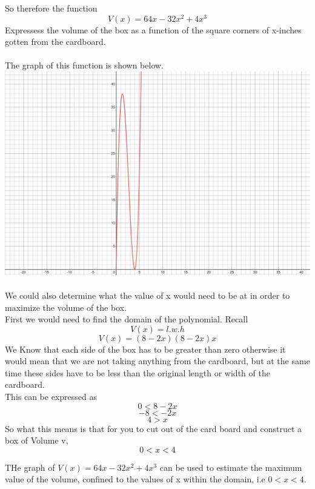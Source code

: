 \documentclass{article}
\begin{document}
So therefore the function
$${V(x) =64x-32x^2+4x^3}$$
Expressess the volume of the box as a function of the square corners of x-inches gotten from the cardboard.\\
\\The graph of this function is shown below.\\
\includegraphics[scale = 0.1]{poly}\\
\\We could also determine what the value of x would need to be at in order to maximize the volume of the box.
\\First we would need to find the domain of the polynomial.
Recall
$${V(x)=l.w.h}$$
$${V(x)=(8-2x)(8-2x)x}$$
We Know that each side of the box has to be greater than zero otherwise it would mean that we are not taking anything from the cardboard, but at the same time these sides have to be less than the original length or width of the cardboard.\\
This can be expressed as
$${0<8-2x}$$
$${-8<-2x}$$
$${4 > x}$$
So what this means is that for you to cut out of the card board and construct a box of Volume v, 
$${0 < x < 4 }$$

THe graph of ${V(x) =64x-32x^2+4x^3}$ can be used to estimate the maximum value of the volume, confined to the values of x within the domain, i.e ${0 < x < 4 }$.\\
\end{document}
